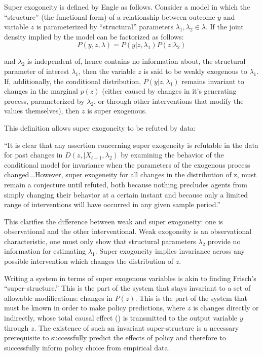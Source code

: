 \documentclass[a4paper,12pt]{article}
\begin{document}
Super exogoneity is defined by Engle as follows. Consider a model in which the ``structure'' (the functional form) of a relationship between outcome $y$ and variable $z$ is parameterized by ``structural'' parameters $\lambda_1, \lambda_2 \in \lambda$. If the joint density implied by the model can be factorized as follows:
%
$$
P(y, z, \lambda) = P(y | z, \lambda_1)P(z | \lambda_2)
$$

and $\lambda_2$ is independent of, hence contains no information about, the structural parameter of interest $\lambda_1$, then the variable $z$ is said to be weakly exogenous to $\lambda_1$. If, additionally, the conditional distribution, $P(y | z, \lambda_1)$ remains invariant to changes in the marginal $p(z)$ (either caused by changes in it's generating process, parameterized by $\lambda_2$, or through other interventions that modify the values themselves), then $z$ is super exogenous.

This definition allows super exogoneity to be refuted by data:

\begin{displayquote}
``It is clear that any assertion concerning super exogeneity is refutable in the data for past changes in $D(z, | X_{t-1}, \lambda_2)$ by examining the behavior of the conditional model for invariance when the parameters of the exogenous process changed...However, super exogeneity for all changes in the distribution of z, must remain a conjecture until refuted, both because nothing precludes agents from simply changing their behavior at a certain instant and because only a limited range of interventions will have occurred in any given sample period.''
\end{displayquote}

This clarifies the difference between weak and super exogoneity: one is observational and the other interventional. Weak exogoneity is an observational characteristic, one must only show that structural parameters $\lambda_2$ provide no information for estimating $\lambda_1$. Super exogoneity implies invariance across any possible intervention which changes the distribution of $z$.

Writing a system in terms of super exogenous variables is akin to finding Frisch's ``super-structure.'' This is the part of the system that stays invariant to a set of allowable modifications: changes in $P(z)$. This is the part of the system that must be known in order to make policy predictions, where $z$ is changes directly or indirectly, whose total causal effect (\cite[in the sense of][]{Pearl2000}) is transmitted to the output variable $y$ through $z$. The existence of such an invariant super-structure is a necessary prerequisite to successfully predict the effects of policy and therefore to successfully inform policy choice from empirical data.
\end{document}
